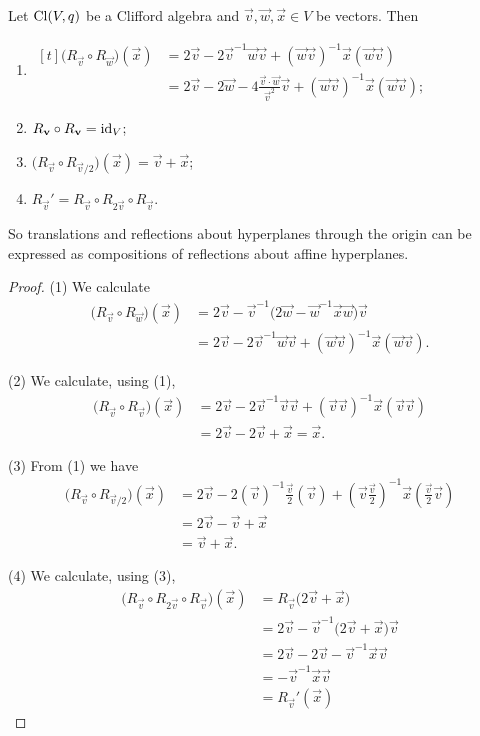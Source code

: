 \begin{lemma}
Let $\operatorname{Cl}(V,q)$ be a Clifford algebra and $\vec{v}, \vec{w}, \vec{x}\in V$ be vectors. Then
\begin{enumerate}
\item $\begin{aligned}[t]\big(R_{\vec{v}}\circ R_{\vec{w}}\big)(\vec{x}) &= 2 \vec{v} - 2\vec{v}^{-1}\vec{w}\vec{v} + (\vec{w}\vec{v})^{-1}\vec{x}(\vec{w}\vec{v}) \\
&= 2 \vec{v} - 2 \vec{w} - 4 \frac{\vec{v}\cdot \vec{w}}{\vec{v}^2}\vec{v} + (\vec{w}\vec{v})^{-1}\vec{x}(\vec{w}\vec{v});\end{aligned}$
\item $R_{\boldsymbol{\mathrm{v}}}\circ R_{\boldsymbol{\mathrm{v}}} = \operatorname{id}_V$;
\item $\big(R_{\vec{v}}\circ R_{\vec{v}/2}\big)(\vec{x}) = \vec{v} + \vec{x}$;
\item $R_{\vec{v}}' = R_{\vec{v}}\circ R_{2\vec{v}}\circ R_{\vec{v}}$.
\end{enumerate}
\end{lemma}
So translations and reflections about hyperplanes through the origin can be expressed as compositions of reflections about affine hyperplanes.
\begin{proof}
(1) We calculate
\begin{align*}
\big(R_{\vec{v}}\circ R_{\vec{w}}\big)(\vec{x}) &= 2 \vec{v} - \vec{v}^{-1}\big(2 \vec{w} - \vec{w}^{-1} \vec{x}\vec{w}\big)\vec{v} \\
&= 2 \vec{v} - 2\vec{v}^{-1}\vec{w}\vec{v} + (\vec{w}\vec{v})^{-1}\vec{x}(\vec{w}\vec{v}).
\end{align*}

(2) We calculate, using (1),
\begin{align*}
\big(R_{\vec{v}}\circ R_{\vec{v}}\big)(\vec{x}) &= 2 \vec{v} - 2\vec{v}^{-1} \vec{v} \vec{v} + (\vec{v}\vec{v})^{-1}\vec{x}(\vec{v}\vec{v}) \\
&= 2 \vec{v} - 2 \vec{v} + \vec{x} = \vec{x}.
\end{align*}

(3) From (1) we have
\begin{align*}
\big(R_{\vec{v}}\circ R_{\vec{v}/2}\big)(\vec{x}) &= 2 \vec{v} - 2(\vec{v})^{-1}\frac{\vec{v}}{2}(\vec{v}) + (\vec{v}\frac{\vec{v}}{2})^{-1}\vec{x}(\frac{\vec{v}}{2}\vec{v}) \\
&= 2 \vec{v} - \vec{v} + \vec{x} \\
&= \vec{v} + \vec{x}.
\end{align*}

(4) We calculate, using (3),
\begin{align*}
\big(R_{\vec{v}} \circ R_{2\vec{v}}\circ R_{\vec{v}}\big)(\vec{x}) &= R_{\vec{v}}\big(2 \vec{v} + \vec{x}\big) \\
&= 2 \vec{v}-\vec{v}^{-1}\big(2 \vec{v} + \vec{x}\big)\vec{v} \\
&= 2 \vec{v} - 2 \vec{v} - \vec{v}^{-1}\vec{x}\vec{v} \\
&= - \vec{v}^{-1}\vec{x}\vec{v} \\
&= R_{\vec{v}}'(\vec{x})
\end{align*}
\end{proof}


